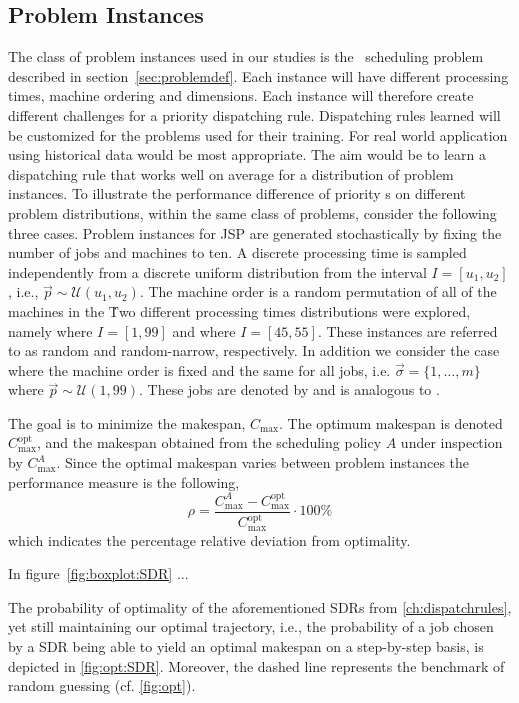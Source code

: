 \documentclass[smallextended]{svjour3}
\begin{document}
\subsection*{Problem Instances}\label{sec:data:sim}

The class of problem instances used in our studies is the \jsp\ scheduling 
problem described in section~\ref{sec:problemdef}. Each instance will have 
different processing times, machine ordering and dimensions. Each instance will 
therefore create different challenges for a priority dispatching rule. 
Dispatching rules learned will be customized for the problems used for their 
training. For real world application using historical data would be most 
appropriate. The aim would be to learn a dispatching rule that works well on 
average for a distribution of problem instances. To illustrate the performance 
difference of priority \dr s on different problem distributions, 
within the same class of problems, consider the following three cases.
Problem instances for JSP are generated stochastically by fixing the number of 
jobs and machines to ten. A discrete processing time is sampled independently 
from a discrete uniform distribution from the interval $I=[u_1,u_2]$, i.e., 
$\vec{p}\sim \mathcal{U}(u_1,u_2)$. 
The machine order is a random permutation of all of the machines in the 
\jsp\. Two different processing times distributions were explored, namely 
where $I=[1,99]$ and  where $I=[45,55]$. These instances 
are referred to as random and random-narrow, respectively. In addition we consider 
the case where the machine order is fixed and the same for all jobs, i.e. $\vec{\sigma}=\{1,\ldots,m\}$
where $\vec{p}\sim\mathcal{U}(1,99)$. These jobs are denoted by  and is analogous to 
.


The goal is to minimize the makespan, $C_{\max}$. The optimum 
makespan is denoted $C_{\max}^{\text{opt}}$, and the makespan obtained from the 
scheduling policy $A$ under inspection by $C_{\max}^{A}$. Since the optimal 
makespan varies between problem instances the performance measure is the 
following,
\begin{equation}\label{eq:ratio}
	\rho=\frac{C_{\max}^{A}-C_{\max}^{\text{opt}}}{C_{\max}^{\text{opt}}}\cdot
	100\%
\end{equation}
which indicates the percentage relative deviation from optimality. %

In figure~\ref{fig:boxplot:SDR} ...

The probability of optimality of the aforementioned SDRs from 
\cref{ch:dispatchrules}, yet still maintaining our optimal trajectory, i.e., 
the probability of a job chosen by a SDR being able to yield an optimal 
makespan on a step-by-step basis, is depicted  in   \cref{fig:opt:SDR}. 
Moreover, the dashed line represents the benchmark of random guessing (cf. 
\cref{fig:opt}).
\end{document}
